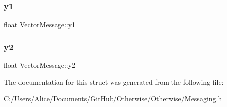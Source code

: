 \subsubsection{\texorpdfstring{y1}{y1}}
{\footnotesize\ttfamily float Vector\+Message\+::y1}

\mbox{\label{struct_vector_message_aad5bfaa77094e6f5b4620bf4c2a07862}} 
\subsubsection{\texorpdfstring{y2}{y2}}
{\footnotesize\ttfamily float Vector\+Message\+::y2}



The documentation for this struct was generated from the following file\+:\begin{DoxyCompactItemize}
\item 
C\+:/\+Users/\+Alice/\+Documents/\+Git\+Hub/\+Otherwise/\+Otherwise/\hyperlink{_messaging_8h}{Messaging.\+h}\end{DoxyCompactItemize}
